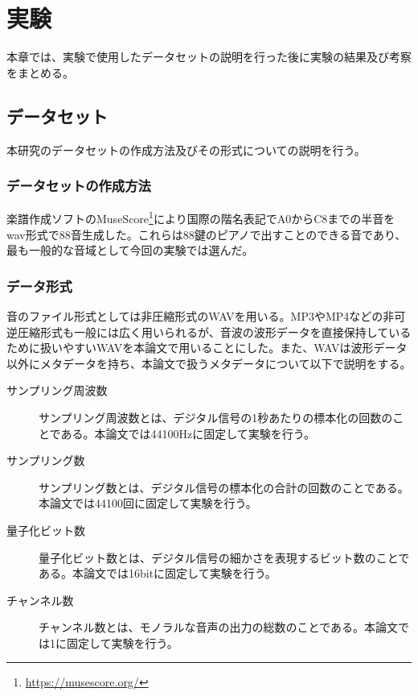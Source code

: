 \chapter{実験}

本章では、実験で使用したデータセットの説明を行った後に実験の結果及び考察をまとめる。

\section{データセット}

本研究のデータセットの作成方法及びその形式についての説明を行う。

\subsection{データセットの作成方法}

楽譜作成ソフトのMuseScore\footnote{\url{https://musescore.org/}}により国際の階名表記でA0からC8までの半音をwav形式で88音生成した。これらは88鍵のピアノで出すことのできる音であり、最も一般的な音域として今回の実験では選んだ。

\subsection{データ形式}

音のファイル形式としては非圧縮形式のWAVを用いる。MP3やMP4などの非可逆圧縮形式も一般には広く用いられるが、音波の波形データを直接保持しているために扱いやすいWAVを本論文で用いることにした。また、WAVは波形データ以外にメタデータを持ち、本論文で扱うメタデータについて以下で説明をする。

\begin{description}

\item[サンプリング周波数]\mbox{}

サンプリング周波数とは、デジタル信号の1秒あたりの標本化の回数のことである。本論文では44100Hzに固定して実験を行う。

\item[サンプリング数]\mbox{}

サンプリング数とは、デジタル信号の標本化の合計の回数のことである。本論文では44100回に固定して実験を行う。

\item[量子化ビット数]\mbox{}

量子化ビット数とは、デジタル信号の細かさを表現するビット数のことである。本論文では16bitに固定して実験を行う。

\item[チャンネル数]\mbox{}

チャンネル数とは、モノラルな音声の出力の総数のことである。本論文では1に固定して実験を行う。

\end{description}

